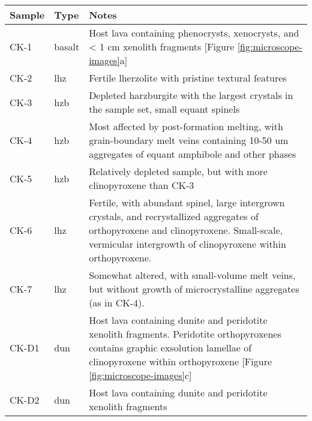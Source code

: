 \begin{tabularx}{\textwidth}{l l X}
\toprule
  Sample & Type & Notes \\
\midrule
  CK-1 & basalt & Host lava containing phenocrysts, xenocrysts, and < 1 cm xenolith fragments [Figure \ref{fig:microscope-images}a] \\
  CK-2 & lhz & Fertile lherzolite with pristine textural features \\
  CK-3 & hzb & Depleted harzburgite with the largest crystals in the sample set, small equant spinels \\
  CK-4 & hzb & Most affected by post-formation melting, with grain-boundary melt veins containing
               10-50 \si{um} aggregates of equant amphibole and other phases \\
  CK-5 & hzb & Relatively depleted sample, but with more clinopyroxene than CK-3 \\
  CK-6 & lhz & Fertile, with abundant spinel, large intergrown crystals, and recrystallized aggregates of orthopyroxene and clinopyroxene. Small-scale,
               vermicular intergrowth of clinopyroxene within orthopyroxene. \\
  CK-7 & lhz & Somewhat altered, with small-volume melt veins, but without growth of microcrystalline aggregates (as in CK-4). \\
  CK-D1 & dun & Host lava containing dunite and peridotite xenolith fragments. Peridotite orthopyroxenes contains graphic exsolution
               lamellae of  clinopyroxene within orthopyroxene [Figure \ref{fig:microscope-images}c] \\
  CK-D2 & dun & Host lava containing dunite and peridotite xenolith fragments \\
\bottomrule
\end{tabularx}
